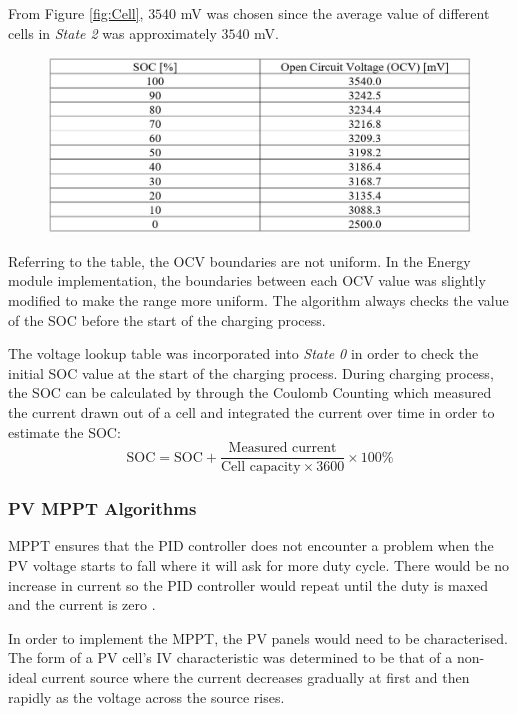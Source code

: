 \documentclass[11pt, a4paper]{article}
\begin{document}
From Figure \ref{fig:Cell}, $3540$ mV was chosen since the average value of different cells in \textit{State 2} was approximately $3540$ mV. 

\begin{figure} [h!]
    \centering
    \includegraphics[scale=0.6]{Energy_SOC.JPG}
\end{figure}

Referring to the table, the OCV boundaries are not uniform. In the Energy module implementation, the boundaries between each OCV value was slightly modified to make the range more uniform. The algorithm always checks the value of the SOC before the start of the charging process.

The voltage lookup table was incorporated into \textit{State 0} in order to check the initial SOC value at the start of the charging process. During charging process, the SOC can be calculated by through the Coulomb Counting which measured the current drawn out of a cell and integrated the current over time in order to estimate the SOC:
$$
    \text{SOC} = \text{SOC} + \frac{\text{Measured current}}{\text{Cell capacity} \times 3600} \times 100\%
$$

\pagebreak

\subsubsection{PV MPPT Algorithms}

MPPT ensures that the PID controller does not encounter a problem when the PV voltage starts to fall where it will ask for more duty cycle. There would be no increase in current so the PID controller would repeat until the duty is maxed and the current is zero \cite{PV_MPPT}.  

In order to implement the MPPT, the PV panels would need to be characterised. The form of a PV cell's IV characteristic was determined to be that of a non-ideal current source \cite{PV_current} where the current decreases gradually at first and then rapidly as the voltage across the source rises.
\end{document}
